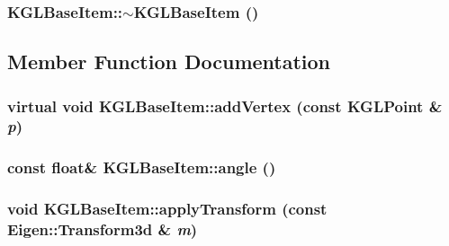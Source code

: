 \hypertarget{class_k_g_l_base_item_8aaeca0452e979304a98056441a14cdd}{
\subsubsection[{$\sim$KGLBaseItem}]{\setlength{\rightskip}{0pt plus 5cm}KGLBaseItem::$\sim$KGLBaseItem ()}}
\label{class_k_g_l_base_item_8aaeca0452e979304a98056441a14cdd}




\subsection{Member Function Documentation}
\hypertarget{class_k_g_l_base_item_3eabedeecf9e7b82d82557c95c56741a}{
\subsubsection[{addVertex}]{\setlength{\rightskip}{0pt plus 5cm}virtual void KGLBaseItem::addVertex (const {\bf KGLPoint} \& {\em p})}}
\label{class_k_g_l_base_item_3eabedeecf9e7b82d82557c95c56741a}


\hypertarget{class_k_g_l_base_item_e81d2c64201c36247fa1d0fda08052c6}{
\subsubsection[{angle}]{\setlength{\rightskip}{0pt plus 5cm}const float\& KGLBaseItem::angle ()}}
\label{class_k_g_l_base_item_e81d2c64201c36247fa1d0fda08052c6}


\hypertarget{class_k_g_l_base_item_49c808d884735aa2df77d8673c250535}{
\subsubsection[{applyTransform}]{\setlength{\rightskip}{0pt plus 5cm}void KGLBaseItem::applyTransform (const Eigen::Transform3d \& {\em m})}}
\label{class_k_g_l_base_item_49c808d884735aa2df77d8673c250535}


